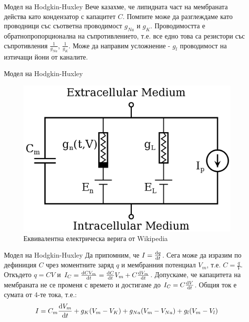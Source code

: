 \begin{frame}[t]{Модел на Hodgkin-Huxley}
  Вече казахме, че липидната част на мембраната действа като кондензатор с капацитет $C$. 
  Помпите може да разглеждаме като проводници със съответна проводимост $g_{Na}$ и $g_{K}$.
  Проводимостта е обратнопропорционална на съпротивлението, 
  т.е. все едно това са резистори със съпротивления $\frac{1}{g_{Na}}$, $\frac{1}{g_{K}}$.
  Може да направим усложнение - $g_{l}$ проводимост на изтичащи йони от каналите. 
\end{frame}

\begin{frame}[t]{Модел на Hodgkin-Huxley}
  \begin{figure}[htbp!]
      \centering
      \includegraphics[width=\textwidth,height=0.7\textheight,keepaspectratio]{hodgkin-huxley-circuit.png}
      \caption{Еквивалентна електрическа верига от Wikipedia}
  \end{figure}
\end{frame}

\begin{frame}[t]{Модел на Hodgkin-Huxley}
  Да припомним, че $I = \dv{q}{t}$. 
  Сега може да изразим по дефиниция $C$ чрез моментните заряд $q$ и мембранния потенциал $V_m$, т.е. $C = \frac{q}{V}$.
  Откъдето $q = C V$ и $I_C = \dv{C V_m}{t} = \dv{C}{t}V_m + C\dv{V_m}{t}$. 
  Допускаме, че капацитета на мембраната не се променя с времето и достигаме до $I_C = C\dv{V}{t}$.
  Общия ток е сумата от 4-те тока, т.е.:
  \begin{equation*}
    I=C_{m}\dv{V_m}{t}+g_{K}(V_{m}-V_{K})+g_{Na}(V_{m}-V_{Na})+g_{l}(V_{m}-V_{l})
  \end{equation*}
\end{frame}

